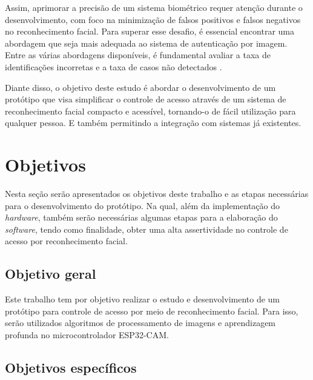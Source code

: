 Assim, aprimorar a precisão de um sistema biométrico requer atenção 
durante o desenvolvimento, com foco na minimização de falsos 
positivos e falsos negativos no reconhecimento facial. Para superar esse 
desafio, é essencial encontrar uma abordagem que seja mais adequada ao 
sistema de autenticação por imagem. Entre as várias abordagens disponíveis, 
é fundamental avaliar a taxa de identificações incorretas e a taxa de 
casos não detectados \cite{viola2004}.


Diante disso, o objetivo deste estudo é abordar o desenvolvimento de um 
protótipo que visa simplificar o controle de acesso através de um sistema 
de reconhecimento facial compacto e acessível, tornando-o de fácil 
utilização para qualquer pessoa. E também permitindo a integração 
com sistemas já existentes. 

\section{Objetivos}\label{sec:objetivos}

Nesta seção serão apresentados os objetivos deste trabalho e as etapas necessárias 
para o desenvolvimento do protótipo. Na qual, além da implementação do 
\textit{hardware}, também serão necessárias algumas etapas para a elaboração do \textit{software}, 
tendo como finalidade, obter uma alta assertividade no controle de acesso por 
reconhecimento facial.

\subsection{Objetivo geral}\label{subsec:objetivoGeral}

Este trabalho tem por objetivo realizar o estudo e desenvolvimento de um protótipo 
para controle de acesso por meio de reconhecimento facial. Para isso, 
serão utilizados algoritmos de processamento de imagens e aprendizagem 
profunda no microcontrolador ESP32-CAM.

\subsection{Objetivos específicos}\label{subsec:objetivosEspecificos}

